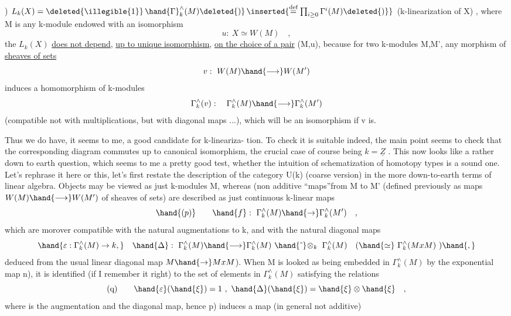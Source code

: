 
)
 \qquad $L_k(X) = \deleted{\illegible{1}}\,\hand{\Gamma}_k^{\wedge}(M)\deleted{)}\,\inserted{\overset{\text{def}}{=}\prod_{i\geq 0}\Gamma^{i}(M)\deleted{)}}$ \hand{(}(k-linearization of X) ,
where M is any k-module endowed with an isomorphism
\[ u:\ X \simeq W(M) \quad , \]
the   $L_k(X)$ \uline{does not depend}, \uline{up to unique isomorphism}, \uline{on the
choice of a pair} (M,u), because  for two k-modules M,M', any
morphism of \uline{sheaves of sets}
\[ v:\ W(M) \hand{\longrightarrow} W(M') \]
induces a  homomorphism of k-modules
\[ \Gamma_k^{\wedge}(v):\quad \Gamma_k^{\wedge}(M) \hand{\longrightarrow} \Gamma_k^{\wedge}(M') \]
(compatible not with multiplications, but with diagonal maps ...), 
which will be an isomorphism if v is.

Thus we do have, it seems to me, a good candidate for k-lineariza-%
tion. To check it is suitable indeed, the main point seems to check
that the corresponding diagram  commutes up to canonical isomorphism,
the crucial case of course being $k=\underline{Z}$ . This now looks like a rather down
to earth question, which seems to me a pretty good test, whether the
intuition of schematization of homotopy types is a sound one. Let's
rephrase it here or this, let's first restate the 
description of the  category U(k) (coarse version) in the more
down-to-earth terms of linear algebra. Objects may be viewed as just
k-modules M, whereas  (non additive\hand{)} ``maps''from M to M' (defined
previously as maps $W(M)\hand{\longrightarrow} W(M')$ of sheaves of sets) are described as
just continuous k-linear maps
\[ \hand{(p)} \qquad \hand{f}:\ \Gamma_k^{\wedge}(M) \hand{\rightarrow} \Gamma_k^{\wedge}(M') \quad , \]
which are morover compatible with the natural augmentations to k,
and with the natural diagonal maps \hand{:}
\[ \hand{\varepsilon:\Gamma_k^{\wedge}(M)\rightarrow k,}\quad \hand{\Delta}:\ \Gamma_k^{\wedge}(M)\hand{\longrightarrow} \Gamma_k^{\wedge}(M)\ \hand{\hat{\ }}\!\otimes_k\ \Gamma_k^{\wedge}(M) \quad (\hand{\simeq}\ \Gamma_k^{\wedge}(MxM)\ )\hand{,} \]
 \deleted{(}deduced from the usual linear diagonal map $M\hand{\rightarrow} MxM$). When M is
looked  as being embedded in $\Gamma_k^{\wedge}(M)$ by the exponential map \hand{(}n),
it is identified (if I remember it right) to the set of elements \inserted{$\xi$} in
$\Gamma_k^{\wedge}(M)$ satisfying the relations
\[ \text{(q)} \qquad \hand{\varepsilon}(\hand{\xi}) = 1 \ ,\ \hand{\Delta}(\hand{\xi}) = \hand{\xi}\otimes\hand{\xi} \quad , \]
where \hand{$\varepsilon$} is the augmentation and \hand{$\Delta$} the diagonal map, hence p) induces
a map (in general not additive)

